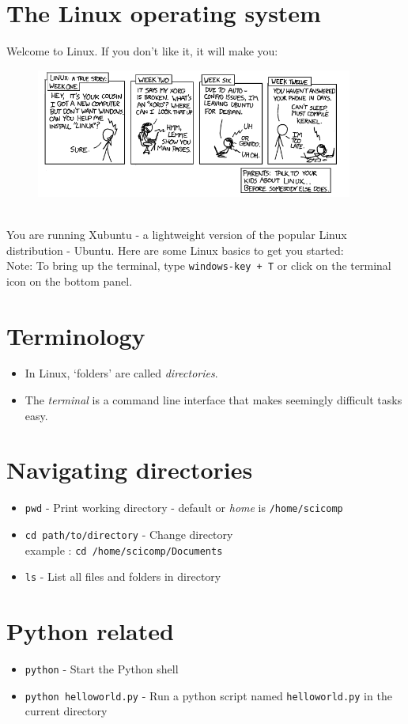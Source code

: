 \documentclass{article}
\begin{document}
\section*{The Linux operating system}
Welcome to Linux. If you don't like it, it will make you:\newline
\begin{figure}[h]
\includegraphics[height=120pt]{../pictures/xkcd_linux.png}
\end{figure}
\newline \\
You are running Xubuntu - a lightweight version of the popular Linux distribution -
Ubuntu. Here are some Linux basics to get you started:
\newline
\\ Note: To bring up the terminal, type \texttt{windows-key + T} or click on the
terminal icon on the bottom panel.
\section*{Terminology}
\begin{itemize}
\item In Linux, `folders' are called \emph{directories}.
\item The \emph{terminal} is a command line interface that makes seemingly difficult
		tasks easy.
\end{itemize} 
\section*{Navigating directories}
\begin{itemize}
\item \texttt{pwd} - Print working directory - default or \emph{home} is \texttt{/home/scicomp}
\item \texttt{cd path/to/directory} - Change directory
\newline
\\ example : \texttt{cd /home/scicomp/Documents}
\item \texttt{ls} - List all files and folders in directory
\end{itemize}
\section*{Python related}
\begin{itemize}
\item \texttt{python} - Start the Python shell
\item \texttt{python helloworld.py} - Run a python script named \texttt{helloworld.py}
			in the current directory
\end{itemize}
\end{document}
